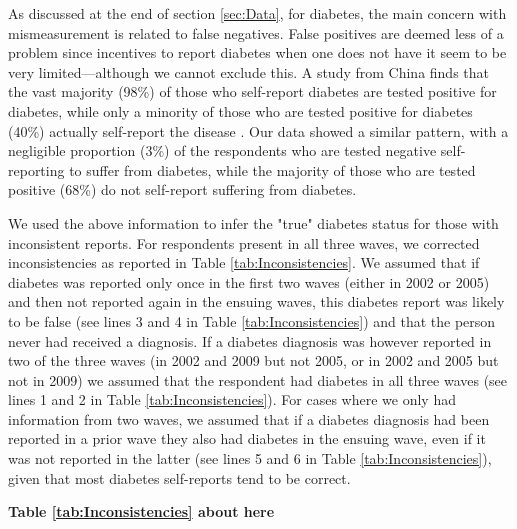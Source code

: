 \documentclass[12pt,english]{article}
\begin{document}
\begin{appendix}
As discussed at the end of section \ref{sec:Data}, for diabetes, the main concern with mismeasurement is related to false negatives. False positives are deemed less of a problem since incentives to report diabetes when one does not have it seem to be very limited---although we cannot exclude this.  A study from China finds that the vast majority (98\%) of those who self-report diabetes are tested positive for diabetes, while only a minority  of those who are tested positive for diabetes (40\%) actually self-report the disease \parencite{Yuan2015}.  Our data showed a similar pattern, with a negligible proportion (3\%) of the respondents who are tested negative self-reporting to suffer from diabetes, while the majority of those who are tested positive (68\%) do not self-report suffering from diabetes.

We used the above information to infer the "true" diabetes status for those with inconsistent reports. For respondents present in all three waves, we corrected inconsistencies as reported in Table \ref{tab:Inconsistencies}. We assumed that if diabetes was reported only once in the first two waves (either in 2002 or 2005) and then not reported again in the ensuing waves, this diabetes report was likely to be false (see lines 3 and 4 in Table \ref{tab:Inconsistencies}) and that the person never had received a diagnosis. If a diabetes diagnosis was however reported in two of the three waves (in 2002 and 2009 but not 2005, or in 2002 and 2005 but not in 2009) we assumed that the respondent had diabetes in all three waves (see lines 1 and 2 in Table \ref{tab:Inconsistencies}). For cases where we only had information from two waves, we assumed that if a diabetes diagnosis had been reported in a prior wave they also had diabetes in the ensuing wave, even if it was not reported in the latter (see lines 5 and 6 in Table \ref{tab:Inconsistencies}), given that most diabetes self-reports tend to be correct.


\begin{center}
	\textbf{Table \ref{tab:Inconsistencies} about here}
\end{center}





\end{appendix}
\end{document}
